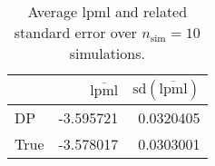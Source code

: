 \begin{table}[H]

\caption{Average lpml and related standard error over $n_{\text{sim}} = 10$ simulations.}
\centering
\begin{tabular}[t]{lrr}
\toprule
  & $\overbar{\text{lpml}}$ & $\text{sd}(\overbar{\text{lpml}})$\\
\midrule
DP & -3.595721 & 0.0320405\\
True & -3.578017 & 0.0303001\\
\bottomrule
\end{tabular}
\end{table}